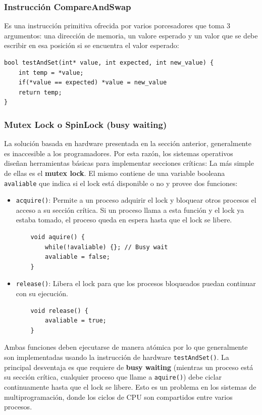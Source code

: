 \subsubsection{Instrucción CompareAndSwap}\label{compareAndSwap}
Es una instrucción primitiva ofrecida por varios porcesadores que toma 3 argumentos: una dirección de memoria, un valore esperado y un valor que se debe escribir en esa posición si se encuentra el valor esperado:

		\begin{verbatim}
bool testAndSet(int* value, int expected, int new_value) {
	int temp = *value;
	if(*value == expected) *value = new_value
	return temp;
}
		\end{verbatim}

\subsubsection{Mutex Lock o SpinLock (busy waiting)} 
La solución basada en hardware presentada en la sección anterior, generalmente es inaccesible a los programadores. Por esta razón, los sistemas operativos diseñan herramientas básicas para implementar secciones críticas: La más simple de ellas es el \textbf{mutex lock}. El mismo contiene de una variable booleana \texttt{avaliable} que indica si el lock está disponible o no y provee dos funciones: 

\begin{itemize}
\item \texttt{acquire()}: Permite a un proceso adquirir el lock y bloquear otros procesos el acceso a su sección crítica. Si un proceso llama a esta función y el lock ya estaba tomado, el proceso queda en espera hasta que el lock se libere.

\begin{verbatim}
	void aquire() {
		while(!avaliable) {}; // Busy wait
		avaliable = false;	
	}
\end{verbatim}
\item \texttt{release()}: Libera el lock para que los procesos bloqueados puedan continuar con su ejecución.
\begin{verbatim}
	void release() {
		avaliable = true;	
	}
\end{verbatim}
\end{itemize}

Ambas funciones deben ejecutarse de manera atómica por lo que generalmente son implementadas usando la instrucción de hardware \texttt{testAndSet()}. La principal desventaja es que requiere de \textbf{busy waiting} (mientras un proceso está su sección crítica, cualquier proceso que llame a \texttt{aquire()}) debe ciclar continuamente hasta que el lock se libere. Esto es un problema en los sistemas de multiprogramación, donde los ciclos de CPU son compartidos entre varios procesos.

